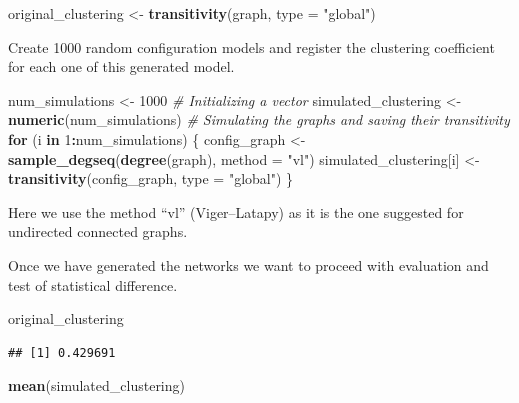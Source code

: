 \documentclass[
]{article}
\newenvironment{Shaded}{\begin{snugshade}}{\end{snugshade}}
\newcommand{\AttributeTok}[1]{\textcolor[rgb]{0.13,0.29,0.53}{#1}}
\newcommand{\CommentTok}[1]{\textcolor[rgb]{0.56,0.35,0.01}{\textit{#1}}}
\newcommand{\ControlFlowTok}[1]{\textcolor[rgb]{0.13,0.29,0.53}{\textbf{#1}}}
\newcommand{\DecValTok}[1]{\textcolor[rgb]{0.00,0.00,0.81}{#1}}
\newcommand{\FunctionTok}[1]{\textcolor[rgb]{0.13,0.29,0.53}{\textbf{#1}}}
\newcommand{\NormalTok}[1]{#1}
\newcommand{\OtherTok}[1]{\textcolor[rgb]{0.56,0.35,0.01}{#1}}
\newcommand{\SpecialCharTok}[1]{\textcolor[rgb]{0.81,0.36,0.00}{\textbf{#1}}}
\newcommand{\StringTok}[1]{\textcolor[rgb]{0.31,0.60,0.02}{#1}}
\begin{document}
\begin{Shaded}
\begin{Highlighting}[]
\NormalTok{original\_clustering }\OtherTok{\textless{}{-}} \FunctionTok{transitivity}\NormalTok{(graph, }\AttributeTok{type =} \StringTok{"global"}\NormalTok{)}
\end{Highlighting}
\end{Shaded}

Create 1000 random configuration models and register the clustering
coefficient for each one of this generated model.

\begin{Shaded}
\begin{Highlighting}[]
\NormalTok{num\_simulations }\OtherTok{\textless{}{-}} \DecValTok{1000}
\CommentTok{\# Initializing a vector}
\NormalTok{simulated\_clustering }\OtherTok{\textless{}{-}} \FunctionTok{numeric}\NormalTok{(num\_simulations)}
\CommentTok{\# Simulating the graphs and saving their transitivity}
\ControlFlowTok{for}\NormalTok{ (i }\ControlFlowTok{in} \DecValTok{1}\SpecialCharTok{:}\NormalTok{num\_simulations) \{}
\NormalTok{  config\_graph }\OtherTok{\textless{}{-}} \FunctionTok{sample\_degseq}\NormalTok{(}\FunctionTok{degree}\NormalTok{(graph), }\AttributeTok{method =} \StringTok{"vl"}\NormalTok{)  }
\NormalTok{  simulated\_clustering[i] }\OtherTok{\textless{}{-}} \FunctionTok{transitivity}\NormalTok{(config\_graph, }\AttributeTok{type =} \StringTok{"global"}\NormalTok{)}
\NormalTok{\}}
\end{Highlighting}
\end{Shaded}

Here we use the method ``vl'' (Viger--Latapy) as it is the one suggested
for undirected connected graphs.

Once we have generated the networks we want to proceed with evaluation
and test of statistical difference.

\begin{Shaded}
\begin{Highlighting}[]
\NormalTok{original\_clustering}
\end{Highlighting}
\end{Shaded}

\begin{verbatim}
## [1] 0.429691
\end{verbatim}

\begin{Shaded}
\begin{Highlighting}[]
\FunctionTok{mean}\NormalTok{(simulated\_clustering)}
\end{Highlighting}
\end{Shaded}
\end{document}
